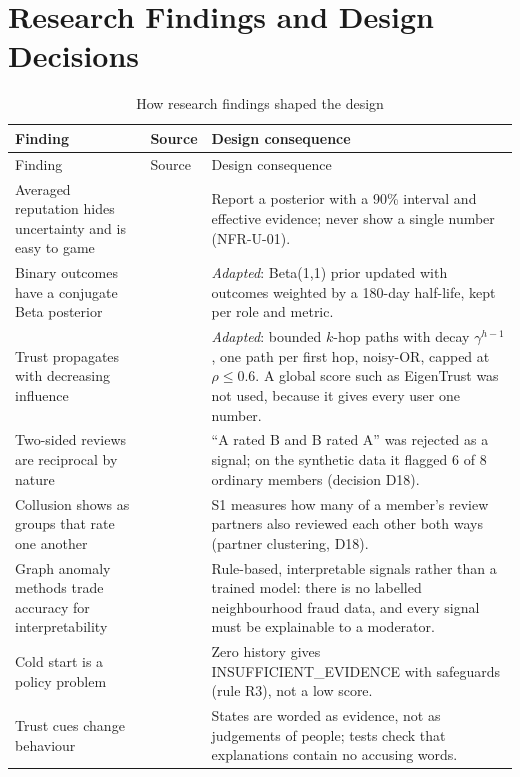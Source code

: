 \section{Research Findings and Design Decisions}\label{sec:research-findings-design-decisions}
\begingroup
\begin{longtable}{@{}L{136pt}L{69pt}L{170pt}@{}}
\caption{How research findings shaped the design}\label{tab:how-research-findings-shaped}\\
\toprule
Finding & Source & Design consequence \\
\midrule
\endfirsthead
\toprule
Finding & Source & Design consequence \\
\midrule
\endhead
\bottomrule
\endlastfoot
Averaged reputation hides uncertainty and is easy to game & \cite{josang2007survey,resnick2000} & Report a posterior with a 90\% interval and effective evidence; never show a single number (NFR-U-01). \\
Binary outcomes have a conjugate Beta posterior & \cite{josang2002beta} & \textit{Adapted}: Beta(1,1) prior updated with outcomes weighted by a 180-day half-life, kept per role and metric. \\
Trust propagates with decreasing influence & \cite{golbeck2005} & \textit{Adapted}: bounded $k$-hop paths with decay $\gamma^{h-1}$, one path per first hop, noisy-OR, capped at $\rho \leq 0.6$. A global score such as EigenTrust \cite{kamvar2003} was not used, because it gives every user one number. \\
Two-sided reviews are reciprocal by nature & \cite{bolton2013,fradkin2021} & ``A rated B and B rated A'' was rejected as a signal; on the synthetic data it flagged 6 of 8 ordinary members (decision D18). \\
Collusion shows as groups that rate one another & \cite{mukherjee2012,hooi2016} & S1 measures how many of a member's review partners also reviewed each other both ways (partner clustering, D18). \\
Graph anomaly methods trade accuracy for interpretability & \cite{akoglu2015} & Rule-based, interpretable signals rather than a trained model: there is no labelled neighbourhood fraud data, and every signal must be explainable to a moderator. \\
Cold start is a policy problem & \cite{schein2002} & Zero history gives INSUFFICIENT\_EVIDENCE with safeguards (rule R3), not a low score. \\
Trust cues change behaviour & \cite{ert2016} & States are worded as evidence, not as judgements of people; tests check that explanations contain no accusing words. \\

\end{longtable}
